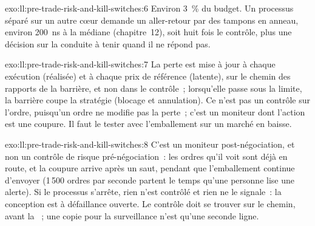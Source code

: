 \begin{solution}{exo:ll:pre-trade-risk-and-kill-switches:6}
Environ 3~\% du budget. Un processus séparé sur un autre cœur demande un aller-retour par des tampons en anneau, environ \qty{200}{\nano\second}
à la médiane (chapitre~12), soit huit fois le contrôle, plus une décision sur la conduite à tenir quand il ne répond pas.
\end{solution}

\begin{solution}{exo:ll:pre-trade-risk-and-kill-switches:7}
La perte est mise à jour à chaque exécution (réalisée) et à chaque prix de référence (latente), sur le chemin des rapports de la barrière, et non dans le
contrôle~; lorsqu'elle passe sous la limite, la barrière coupe la stratégie (blocage et annulation). Ce n'est pas un contrôle sur l'ordre, puisqu'un
ordre ne modifie pas la perte~; c'est un moniteur dont l'action est une coupure. Il faut le tester avec l'emballement sur un marché en baisse.
\end{solution}

\begin{solution}{exo:ll:pre-trade-risk-and-kill-switches:8}
C'est un moniteur post-négociation, et non un contrôle de risque pré-négociation~: les ordres qu'il voit sont déjà en route, et la coupure arrive après un
saut, pendant que l'emballement continue d'envoyer (1\,500 ordres par seconde partent le temps qu'une personne lise une alerte). Si le processus s'arrête,
rien n'est contrôlé et rien ne le signale~: la conception est à défaillance ouverte. Le contrôle doit se trouver sur le chemin, avant la ~; une copie pour
la surveillance n'est qu'une seconde ligne.
\end{solution}

